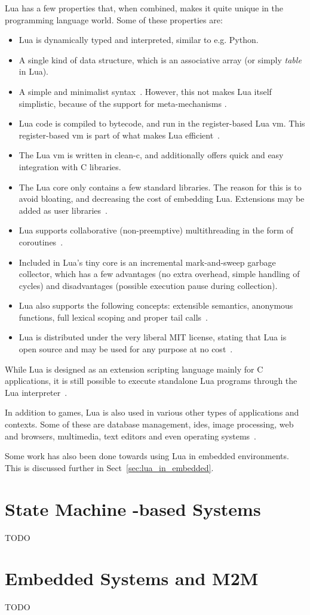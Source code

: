 Lua has a few properties that, when combined, makes it quite unique in the programming language world. Some of these properties are:
\begin{itemize}
	\item Lua is dynamically typed and interpreted, similar to e.g. Python.
	\item A single kind of data structure, which is an associative array (or simply \emph{table} in Lua).
	\item A simple and minimalist syntax~\cite[ch. 9]{manual:lua_reference_manual}. However, this not makes Lua itself simplistic, because of the support for meta-mechanisms \cite{manual:lua_reference_manual}.
	\item Lua code is compiled to bytecode, and run in the register-based Lua \gls{vm}. This register-based \gls{vm} is part of what makes Lua efficient~\cite{article:the_implementation_of_lua}.
	\item The Lua \gls{vm} is written in \gls{clean-c}, and additionally offers quick and easy integration with C libraries.
	\item The Lua core only contains a few standard libraries. The reason for this is to avoid bloating, and decreasing the cost of embedding Lua. Extensions may be added as user libraries~\cite{article:the_implementation_of_lua}.
	\item Lua supports collaborative (non-preemptive) multithreading in the form of coroutines~\cite[ch. 2.6]{manual:lua_reference_manual}.
	\item Included in Lua's tiny core is an incremental mark-and-sweep garbage collector, which has a few advantages (no extra overhead, simple handling of cycles) and disadvantages (possible execution pause during collection).
	\item Lua also supports the following concepts: extensible semantics, anonymous functions, full lexical scoping and proper tail calls~\cite{inproceedings:the_evolution_of_lua}.
	\item Lua is distributed under the very liberal MIT license, stating that Lua is open source and may be used for any purpose at no cost~\cite{website:lua_license}.
\end{itemize}

While Lua is designed as an extension scripting language mainly for C applications, it is still possible to execute standalone Lua programs through the Lua interpreter~\cite[ch. 7]{manual:lua_reference_manual}.

In addition to games, Lua is also used in various other types of applications and contexts. Some of these are database management, \glspl{ide}, image processing, web and browsers, multimedia, text editors and even operating systems~\cite{website:where_lua_is_used}.

Some work has also been done towards using Lua in embedded environments. This is discussed further in Sect~\ref{sec:lua_in_embedded}.

\section{State Machine -based Systems}
\label{sec:state_machine_system}
TODO

\section{Embedded Systems and M2M}
\label{sec:embedded_m2m}
TODO